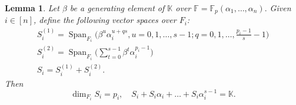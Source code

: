 \documentclass[11pt,onecolumn]{IEEEtran}
\newtheorem{lemma}{Lemma}
\DeclareMathOperator{\spun}{Span}
\begin{document}
\begin{lemma}\label{lem1} %
Let $\beta$ be a generating element of $\mathbb K$ over $\mathbb{F}=\mathbb{F}_p(\alpha_1,\dots,\alpha_n).$
Given $i\in [n]$, define the following vector spaces over $F_i$:
\begin{gather*}
S_i^{(1)} =\spun_{F_i} \big(\beta^u \alpha_i^{u+qs}, u=0,1,\dots,s-1; q=0,1,\dots,\textstyle{\frac{p_i-1}{s}}-1 \big) \\
S_i^{(2)}  =\spun_{F_i} \Big(\sum_{t=0}^{s - 1}\beta^t \alpha_i^{p_i-1} \Big) \\
S_i   =S_i^{(1)} + S_i^{(2)}.
\end{gather*}
Then 
$$
\dim_{F_i} S_i = p_i, \quad
S_i + S_i\alpha_i+\dots + S_i\alpha_i^{s-1}=\mathbb{K}.
$$
\end{lemma}
\end{document}

